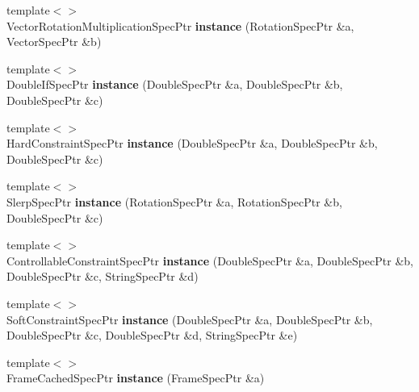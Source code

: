 \begin{DoxyCompactItemize}
\item 
\hypertarget{namespacegiskard__suturo_a088cc0541762806d2ac7af58854b17db}{{\footnotesize template$<$$>$ }\\Vector\-Rotation\-Multiplication\-Spec\-Ptr {\bfseries instance} (Rotation\-Spec\-Ptr \&a, Vector\-Spec\-Ptr \&b)}\label{namespacegiskard__suturo_a088cc0541762806d2ac7af58854b17db}

\item 
\hypertarget{namespacegiskard__suturo_aa6e4e3a387479c5d72f9cb0ec9a94b6b}{{\footnotesize template$<$$>$ }\\Double\-If\-Spec\-Ptr {\bfseries instance} (Double\-Spec\-Ptr \&a, Double\-Spec\-Ptr \&b, Double\-Spec\-Ptr \&c)}\label{namespacegiskard__suturo_aa6e4e3a387479c5d72f9cb0ec9a94b6b}

\item 
\hypertarget{namespacegiskard__suturo_ad46453a1a32d7a7499aab941513ba69a}{{\footnotesize template$<$$>$ }\\Hard\-Constraint\-Spec\-Ptr {\bfseries instance} (Double\-Spec\-Ptr \&a, Double\-Spec\-Ptr \&b, Double\-Spec\-Ptr \&c)}\label{namespacegiskard__suturo_ad46453a1a32d7a7499aab941513ba69a}

\item 
\hypertarget{namespacegiskard__suturo_a04bf89a007d4bbe173d49f3ef4c2f01a}{{\footnotesize template$<$$>$ }\\Slerp\-Spec\-Ptr {\bfseries instance} (Rotation\-Spec\-Ptr \&a, Rotation\-Spec\-Ptr \&b, Double\-Spec\-Ptr \&c)}\label{namespacegiskard__suturo_a04bf89a007d4bbe173d49f3ef4c2f01a}

\item 
\hypertarget{namespacegiskard__suturo_adb776db420d2d893a48bb26b8886f795}{{\footnotesize template$<$$>$ }\\Controllable\-Constraint\-Spec\-Ptr {\bfseries instance} (Double\-Spec\-Ptr \&a, Double\-Spec\-Ptr \&b, Double\-Spec\-Ptr \&c, String\-Spec\-Ptr \&d)}\label{namespacegiskard__suturo_adb776db420d2d893a48bb26b8886f795}

\item 
\hypertarget{namespacegiskard__suturo_a51d891ee4f20c418e406a1775ad1491f}{{\footnotesize template$<$$>$ }\\Soft\-Constraint\-Spec\-Ptr {\bfseries instance} (Double\-Spec\-Ptr \&a, Double\-Spec\-Ptr \&b, Double\-Spec\-Ptr \&c, Double\-Spec\-Ptr \&d, String\-Spec\-Ptr \&e)}\label{namespacegiskard__suturo_a51d891ee4f20c418e406a1775ad1491f}

\item 
\hypertarget{namespacegiskard__suturo_a11799c3c15094330a4e253581fbfbe85}{{\footnotesize template$<$$>$ }\\Frame\-Cached\-Spec\-Ptr {\bfseries instance} (Frame\-Spec\-Ptr \&a)}\label{namespacegiskard__suturo_a11799c3c15094330a4e253581fbfbe85}


\end{DoxyCompactItemize}
